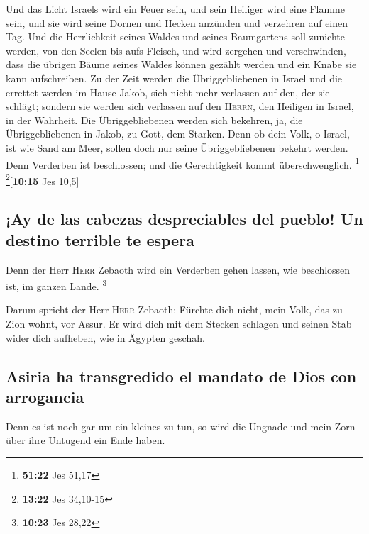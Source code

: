 Und das Licht Israels wird ein Feuer sein, und sein Heiliger wird eine
Flamme sein, und sie wird seine Dornen und Hecken anzünden und verzehren
auf einen Tag.  Und die Herrlichkeit seines Waldes und
seines Baumgartens soll zunichte werden, von den Seelen bis aufs
Fleisch, und wird zergehen und verschwinden,  dass die
übrigen Bäume seines Waldes können gezählt werden und ein Knabe sie kann
aufschreiben.  Zu der Zeit werden die Übriggebliebenen in
Israel und die errettet werden im Hause Jakob, sich nicht mehr verlassen
auf den, der sie schlägt; sondern sie werden sich verlassen auf den
\textsc{Herrn}, den Heiligen in Israel, in der Wahrheit. 
Die Übriggebliebenen werden sich bekehren, ja, die Übriggebliebenen in
Jakob, zu Gott, dem Starken.  Denn ob dein Volk, o
Israel, ist wie Sand am Meer, sollen doch nur seine Übriggebliebenen
bekehrt werden. Denn Verderben ist beschlossen; und die Gerechtigkeit
kommt überschwenglich. \footnote{\textbf{51:22} Jes 51,17}
\footnote{\textbf{13:22} Jes 34,10-15}{[}\textbf{10:15} Jes 10,5{]}

\hypertarget{ay-de-las-cabezas-despreciables-del-pueblo-un-destino-terrible-te-espera}{%
\subsection{¡Ay de las cabezas despreciables del pueblo! Un destino
terrible te
espera}\label{ay-de-las-cabezas-despreciables-del-pueblo-un-destino-terrible-te-espera}}

 Denn der Herr \textsc{Herr} Zebaoth wird ein Verderben
gehen lassen, wie beschlossen ist, im ganzen Lande. \footnote{\textbf{10:23}
  Jes 28,22}

 Darum spricht der Herr \textsc{Herr} Zebaoth: Fürchte
dich nicht, mein Volk, das zu Zion wohnt, vor Assur. Er wird dich mit
dem Stecken schlagen und seinen Stab wider dich aufheben, wie in Ägypten
geschah.

\hypertarget{asiria-ha-transgredido-el-mandato-de-dios-con-arrogancia}{%
\subsection{Asiria ha transgredido el mandato de Dios con
arrogancia}\label{asiria-ha-transgredido-el-mandato-de-dios-con-arrogancia}}

 Denn es ist noch gar um ein kleines zu tun, so wird die
Ungnade und mein Zorn über ihre Untugend ein Ende haben.


